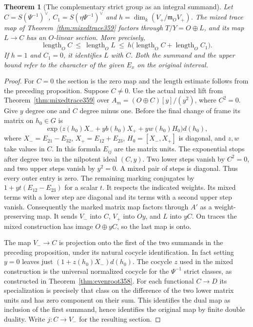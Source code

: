 \documentclass[a4paper,11pt]{article}
\newtheorem{theorem}[proposition]{Theorem}
\theoremstyle{definition}
\theoremstyle{remark}
\newcommand{\len}{\operatorname{length}}\newcommand{\Res}{\operatorname*{Res}}
\numberwithin{equation}{section}
\begin{document}
\begin{theorem}[The complementary strict group as an integral summand]
\label{thm:adjtorsion381}
Let \(C=S(\Psi^{-1})^\vee\), \(C_1=S(\eta\Psi^{-1})^\vee\)
and \(h=\dim_k(V_+/\mathfrak m_O V_+)\). The mixed trace map
of Theorem~\ref{thm:mixedtrace359} factors through
\(T/Y=O\oplus L\), and its map \(L\to C\) has an
\(O\)-linear section. More precisely,
\[
  \len_O C\ \le\ \len_O L\ \le\
          h\bigl(\len_O C+\len_O C_1\bigr).
\]
If \(h=1\) and \(C_1=0\), it identifies \(L\) with \(C\).
Both the summand and the upper bound refer to the character
of the given \(E_x\) on the original interval.
\end{theorem}
\begin{proof}
For \(C=0\) the section is the zero map and the length estimate
follows from the preceding proposition. Suppose \(C\ne0\).
Use the actual mixed lift from Theorem~\ref{thm:mixedtrace359}
over \(A_m=(O\oplus C)[y]/(y^2)\), where \(C^2=0\).
Give \(y\) degree one and \(C\) degree minus one. Before
the final change of frame its matrix on \(h_0\in G\) is
\[
 \exp\bigl(z(h_0)X_-+y b(h_0)X_++y w(h_0)H_0\bigr)d(h_0),
\]
where \(X_-=E_{21}-E_{32}\), \(X_+=E_{12}+E_{23}\),
\(H_0=[X_-,X_+]\) is diagonal, and \(z,w\) take values in
\(C\). In this formula \(E_{ij}\) are the matrix units.
The exponential stops after degree two in the nilpotent ideal
\((C,y)\). Two lower steps vanish by \(C^2=0\), and two
upper steps vanish by \(y^2=0\). A mixed pair of steps is
diagonal. Thus every outer entry is zero. The remaining marking
conjugates by \(1+y t(E_{12}-E_{23})\) for a scalar \(t\).
It respects the indicated weights. Its mixed terms with a
lower step are diagonal and its terms with a second upper step
vanish. Consequently the marked matrix map factors through
\(A'\) as a weight-preserving map. It sends
\(V_-\) into \(C\), \(V_+\) into \(Oy\), and \(L\) into \(yC\).
On traces the mixed construction has image \(O\oplus yC\),
so the last map is onto.

The map \(V_-\to C\) is projection onto the first of the two
summands in the preceding proposition, under its natural
cocycle identification. In fact setting \(y=0\) leaves just
\((1+z(h_0)X_-)d(h_0)\). The cocycle \(z\) used in the mixed
construction is the universal normalized cocycle for the
\(\Psi^{-1}\) strict classes, as constructed in
Theorem~\ref{thm:evenroot358}. For each functional \(C\to D\)
its specialization is precisely that class on the difference
of the two lower matrix units and has zero component on
their sum. This identifies the dual map as inclusion of the
first summand, hence identifies the original map by finite
double duality. Write \(j:C\to V_-\) for the resulting section.


\end{proof}
\end{document}
